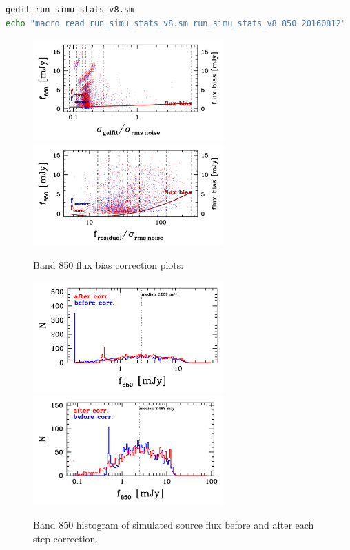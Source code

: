 \documentclass[11pt,a4paper]{article}
\begin{document}
\begin{lstlisting}[language=bash]
gedit run_simu_stats_v8.sm
echo "macro read run_simu_stats_v8.sm run_simu_stats_v8 850 20160812" | sm
\end{lstlisting}

\begin{figure}[H]
	\caption{
		Band 850 flux bias correction plots:
	}
	\includegraphics[width=0.65\textwidth]{galsim_850_fbias_1}
	\includegraphics[width=0.65\textwidth]{galsim_850_fbias_2}
\end{figure}

\begin{figure}[H]
	\caption{
		Band 850 histogram of simulated source flux before and after each step correction. 
	}
	\includegraphics[width=0.65\textwidth]{galsim_850_hist_flux_1}
	\includegraphics[width=0.65\textwidth]{galsim_850_hist_flux_2}
\end{figure}
\end{document}
